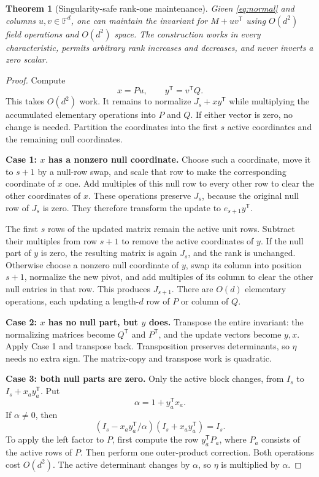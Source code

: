 \documentclass[11pt,letterpaper]{article}
\newtheorem{theorem}{Theorem}[section]
\theoremstyle{definition}\newtheorem{definition}[theorem]{Definition}
\theoremstyle{remark}\newtheorem{remark}[theorem]{Remark}
\newcommand{\F}{\mathbb F}
\newcommand{\trans}{^{\mathsf T}}
\begin{document}
\begin{theorem}[Singularity-safe rank-one maintenance]
\label{thm:rank}
Given \eqref{eq:normal} and columns $u,v\in\F^d$, one can maintain the invariant for $M+uv\trans$ using $O(d^2)$ field operations and $O(d^2)$ space. The construction works in every characteristic, permits arbitrary rank increases and decreases, and never inverts a zero scalar.
\end{theorem}
\begin{proof}
Compute
\[
 x=Pu,\qquad y\trans=v\trans Q.
\]
This takes $O(d^2)$ work. It remains to normalize $J_s+xy\trans$ while multiplying the accumulated elementary operations into $P$ and $Q$. If either vector is zero, no change is needed. Partition the coordinates into the first $s$ active coordinates and the remaining null coordinates.

\medskip\noindent\textbf{Case 1: $x$ has a nonzero null coordinate.}
Choose such a coordinate, move it to $s+1$ by a null-row swap, and scale that row to make the corresponding coordinate of $x$ one. Add multiples of this null row to every other row to clear the other coordinates of $x$. These operations preserve $J_s$, because the original null row of $J_s$ is zero. They therefore transform the update to $e_{s+1}y\trans$.

The first $s$ rows of the updated matrix remain the active unit rows. Subtract their multiples from row $s+1$ to remove the active coordinates of $y$. If the null part of $y$ is zero, the resulting matrix is again $J_s$, and the rank is unchanged. Otherwise choose a nonzero null coordinate of $y$, swap its column into position $s+1$, normalize the new pivot, and add multiples of its column to clear the other null entries in that row. This produces $J_{s+1}$. There are $O(d)$ elementary operations, each updating a length-$d$ row of $P$ or column of $Q$.

\medskip\noindent\textbf{Case 2: $x$ has no null part, but $y$ does.}
Transpose the entire invariant: the normalizing matrices become $Q\trans$ and $P\trans$, and the update vectors become $y,x$. Apply Case 1 and transpose back. Transposition preserves determinants, so $\eta$ needs no extra sign. The matrix-copy and transpose work is quadratic.

\medskip\noindent\textbf{Case 3: both null parts are zero.}
Only the active block changes, from $I_s$ to $I_s+x_ay_a\trans$. Put
\[
 \alpha=1+y_a\trans x_a.
\]
If $\alpha\neq0$, then
\[
 (I_s-x_ay_a\trans/\alpha)(I_s+x_ay_a\trans)=I_s.
\]
To apply the left factor to $P$, first compute the row $y_a\trans P_a$, where $P_a$ consists of the active rows of $P$. Then perform one outer-product correction. Both operations cost $O(d^2)$. The active determinant changes by $\alpha$, so $\eta$ is multiplied by $\alpha$.


\end{proof}
\end{document}
